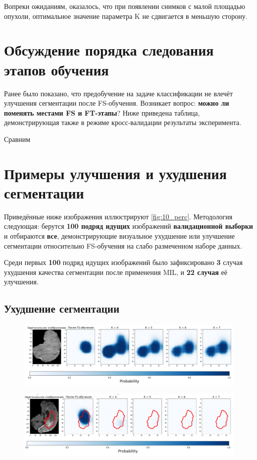 Вопреки ожиданиям, оказалось, что при появлении снимков с малой площадью опухоли, оптимальное значение параметра K не сдвигается в меньшую сторону.

\section{Обсуждение порядка следования этапов обучения}

Ранее было показано, что предобучение на задаче классификации не влечёт улучшения сегментации после FS-обучения. Возникает вопрос:  {\bf можно ли поменять местами FS и FT-этапы}? Ниже приведена таблица, демонстрирующая также в режиме кросс-валидации результаты эксперимента.

Сравним



\section{Примеры улучшения и ухудшения сегментации}

Приведённые ниже изображения иллюстрируют \ref{fig:10_perc}. Методология следующая: берутся {\bf 100 подряд идущих} изображений {\bf валидационной выборки} и отбираются {\bf все}, демонстрирующие визуальное ухудшение или улучшение сегментации относительно FS-обучения на слабо размеченном наборе данных. 

Среди первых {\bf 100} подряд идущих изображений было зафиксировано {\bf 3} случая ухудшения качества сегментации после применения MIL, и {\bf 22 случая} её улучшения. 

\subsection{Ухудшение сегментации}

\begin{figure}[h!] 
  \center
  \includegraphics [scale=0.7] {images/bad_1.png}
\end{figure}

\begin{figure}[h!] 
  \center
  \includegraphics [scale=0.7] {images/bad_2.png}
\end{figure}


